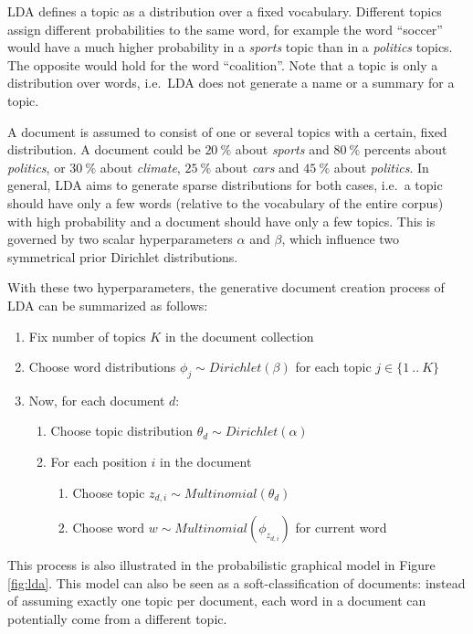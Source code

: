 \documentclass{sig-alternate-05-2015}
\begin{document}
LDA defines a topic as a distribution over a fixed vocabulary.
Different topics assign different probabilities to the same word, for example the word ``soccer'' would have a much higher probability in a \emph{sports} topic than in a \emph{politics} topics.
The opposite would hold for the word ``coalition''.
Note that a topic is only a distribution over words, i.e.\ LDA does not generate a name or a summary for a topic.

A document is assumed to consist of one or several topics with a certain, fixed distribution.
A document could be $20~\%$ about \emph{sports} and $80~\%$ percents about \emph{politics}, or $30~\%$ about \emph{climate}, $25~\%$ about \emph{cars} and $45~\%$ about \emph{politics}.
In general, LDA aims to generate sparse distributions for both cases, i.e.\ a topic should have only a few words (relative to the vocabulary of the entire corpus) with high probability and a document should have only a few topics.
This is governed by two scalar hyperparameters $\alpha$ and $\beta$, which influence two symmetrical prior Dirichlet distributions.

With these two hyperparameters, the generative document creation process of LDA can be summarized as follows:
\begin{enumerate}
       \item Fix number of topics $K$ in the document collection
       \item Choose word distributions $\phi_j \sim Dirichlet(\beta)$ for each topic $j \in \{1~..~K\}$
       \item Now, for each document $d$:
       \begin{enumerate}
              \item Choose topic distribution $\theta_d \sim Dirichlet(\alpha)$
              \item For each position $i$ in the document
              \begin{enumerate}
                     \item Choose topic $z_{d,i} \sim Multinomial(\theta_d)$
                     \item Choose word $w \sim Multinomial(\phi_{z_{d,i}})$ for current word
              \end{enumerate}
       \end{enumerate}
\end{enumerate}
This process is also illustrated in the probabilistic graphical model in Figure \ref{fig:lda}.
This model can also be seen as a soft-classification of documents: instead of assuming exactly one topic per document, each word in a document can potentially come from a different topic.
\end{document}
